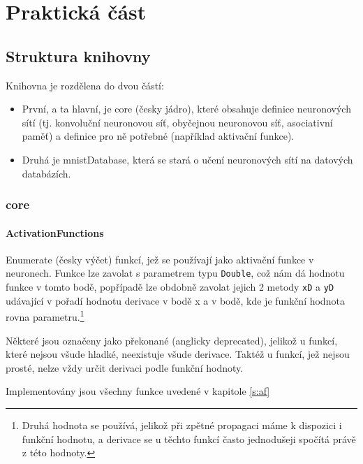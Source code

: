 \documentclass[12pt]{report}			%
\begin{document}
			
		
	\part{Praktická část}
	
		\chapter{Struktura knihovny}
			Knihovna je rozdělena do dvou částí:
			\begin{itemize}
				\item První, a ta hlavní, je core (česky jádro), které obsahuje definice neuronových sítí (tj. konvoluční neuronovou síť, obyčejnou neuronovou síť, asociativní paměť) a definice pro ně potřebné (například aktivační funkce).
				\item Druhá je mnistDatabase, která se stará o učení neuronových sítí na datových databázích.
			\end{itemize}
			
			\section{core}
			
				\subsection{ActivationFunctions}
					Enumerate (česky výčet) funkcí, jež se používají jako aktivační funkce v neuronech. Funkce lze zavolat s parametrem typu \verb!Double!, což nám dá hodnotu funkce v tomto bodě, popřípadě lze obdobně zavolat jejich 2 metody \verb!xD! a \verb!yD! udávající v pořadí hodnotu derivace v bodě x a v bodě, kde je funkční hodnota rovna parametru.\footnote{Druhá hodnota se používá, jelikož při zpětné propagaci máme k dispozici i funkční hodnotu, a derivace se u těchto funkcí často jednodušeji spočítá právě z této hodnoty.}
					
					Některé jsou označeny jako překonané (anglicky deprecated), jelikož u funkcí, které nejsou všude hladké, neexistuje všude derivace. Taktéž u funkcí, jež nejsou prosté, nelze vždy určit derivaci podle funkční hodnoty.
					
					Implementovány jsou všechny funkce uvedené v kapitole \ref{s:af}
			
\end{document}
